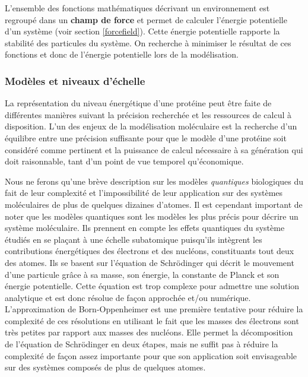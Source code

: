 L'ensemble des fonctions mathématiques décrivant un environnement est regroupé dans un \textbf{champ de force} et permet de calculer l'énergie potentielle d'un système (voir section \ref{forcefield}). Cette énergie potentielle rapporte la stabilité des particules du système. On recherche à minimiser le résultat de ces fonctions et donc de l'énergie potentielle lors de la modélisation.


\subsubsection{Modèles et niveaux d'échelle}

La représentation du niveau énergétique d'une protéine peut être faite de différentes manières suivant la précision recherchée et les ressources de calcul à disposition. L'un des enjeux de la modélisation moléculaire est la recherche d'un équilibre entre une précision suffisante pour que le modèle d'une protéine soit considéré comme pertinent et la puissance de calcul nécessaire à sa génération qui doit raisonnable, tant d'un point de vue temporel qu'économique.

 \label{quantic}

Nous ne ferons qu'une brève description sur les modèles \textit{quantiques} biologiques du fait de leur complexité et l'impossibilité de leur application sur des systèmes moléculaires de plus de quelques dizaines d'atomes. Il est cependant important de noter que les modèles quantiques sont les modèles les plus précis pour décrire un système moléculaire. Ils prennent en compte les effets quantiques du système étudiés en se plaçant à une échelle subatomique puisqu'ils intègrent les contributions énergétiques des électrons et des nucléons, constituants tout deux des atomes. Ils se basent sur l'équation de Schrödinger \cite{schrodinger1926undulatory} qui décrit le mouvement d'une particule grâce à sa masse, son énergie, la constante de Planck et son énergie potentielle. Cette équation est trop complexe pour admettre une solution analytique et est donc résolue de façon approchée et/ou numérique. L'approximation de Born-Oppenheimer \cite{born1927quantentheorie} est une première tentative pour réduire la complexité de ces résolutions en utilisant le fait que les masses des électrons sont très petites par rapport aux masses des nucléons. Elle permet la décomposition de l'équation de Schrödinger en deux étapes, mais ne suffit pas à réduire la complexité de façon assez importante pour que son application soit envisageable sur des systèmes composés de plus de quelques atomes.

